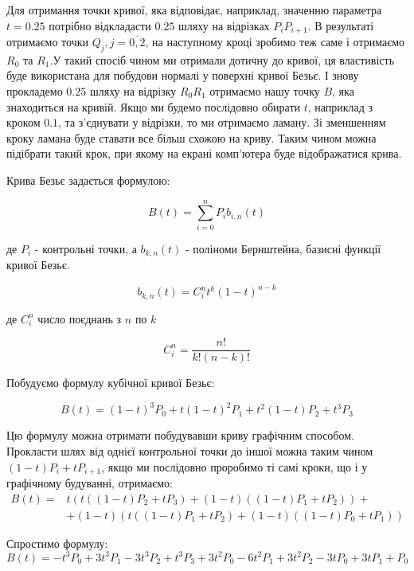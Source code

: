 \let\mypdfximage\pdfximage\def\pdfximage{\immediate\mypdfximage}\documentclass[14pt,a4paper]{extarticle}
\theoremstyle{definition}
\renewcommand{\[}{\begin{singlespace}\begin{equation*}}
\renewcommand{\]}{\end{equation*}\end{singlespace}}
\renewcommand{\+}{\discretionary{\mbox{\scriptsize$\hookleftarrow$}}{}{}}
\begin{document}
Для отримання точки кривої, яка відповідає, наприклад, значенню параметра $t=0.25$ потрібно відкладасти $0.25$ шляху на відрізках $P_iP_{i+1}$. В результаті отримаємо точки $Q_{j}, j=\overline{0,2}$, на наступному кроці зробимо теж саме і отримаємо $R_0$ та $R_1$.У такий спосіб чином ми отримали дотичну до кривої, ця властивість буде використана для побудови нормалі у поверхні кривої Безьє. І знову прокладемо $0.25$ шляху на відрізку $R_0R_1$ отримаємо нашу точку $B$, яка знаходиться на кривій. Якщо ми будемо послідовно обирати $t$, наприклад з кроком $0.1$, та з'єднувати у відрізки, то ми отримаємо ламану. Зі зменшенням кроку ламана буде ставати все більш схожою на криву. Таким чином можна підібрати такий крок, при якому на екрані комп'ютера буде відображатися крива.

Крива Безьє задається формулою:
\[B(t)=\sum_{i=0}^n P_i b_{i,n}(t)\]
де $P_i$ - контрольні точки, а $b_{k,n}(t)$ - поліноми Бернштейна, базисні функції кривої Безьє.
\[b_{k,n}(t)=C_i^nt^k(1-t)^{n-k}\]
де $C_i^n$ число поєднань з $n$ по $k$
\[C_i^n=\frac{n!}{k!(n-k)!}\]

Побудуємо формулу кубічної кривої Безьє:
\[B(t)=(1-t)^3P_0+t(1-t)^2P_1+t^2(1-t)P_2+t^3P_3\]

Цю формулу можна отримати побудувавши криву графічним способом. Прокласти шлях від однієї контрольної точки до іншої можна таким чином $(1-t)P_i+tP_{i+1}$, якщо ми послідовно проробимо ті самі кроки, що і у графічному будуванні, отримаємо:
\begin{align*}
B(t)=&t (t ((1 - t) P_{2} + t P_{3}) + (1 - t) ((1 - t) P_{1} + t P_{2})) +\\
&+(1 - t) (t ((1 - t) P_{1} + t P_{2}) + (1 - t) ((1 - t) P_{0} + t P_{1}))
\end{align*}

Спростимо формулу:
\begin{equation}
\label{eq:bezier_curve}
B(t) = -t^3P_0+3t^3P_1-3t^3P_2+t^3P_3 + 3t^2P_0-6t^2P_1+3t^2P_2 - 3tP_0+3tP_1 + P_0
\end{equation}
\end{document}
